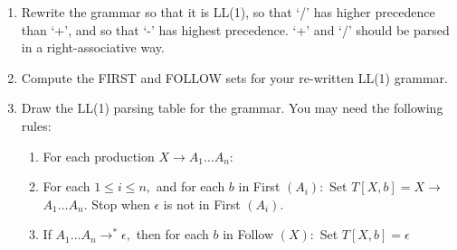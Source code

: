 \documentclass[a4paper]{exam}
\begin{document}
\begin{enumerate}
  \item Rewrite the grammar so that it is LL(1), so that ‘/’ has higher precedence than
  ‘+’, and so that ‘-’ has highest precedence. ‘+’ and ‘/’ should be parsed in a
  right-associative way.
  \item  Compute the FIRST and FOLLOW sets for your re-written LL(1) grammar.
  \item Draw the LL(1) parsing table for the grammar. You may need the following rules:
  \begin{enumerate}
    \item  For each production $X \rightarrow A_{1} \ldots A_{n}:$
    \item For each $1 \leq i \leq n,$ and for each $b$ in First $\left(A_{i}\right):$ Set $T[X, b]=X \rightarrow$
    $A_{1} \ldots A_{n} .$ Stop when $\epsilon$ is not in First $\left(A_{i}\right) .$
    \item If $A_{1} \ldots A_{n} \rightarrow^{*} \epsilon,$ then for each $b$ in Follow $(X):$ Set $T[X, b]=\epsilon$
  \end{enumerate}
\end{enumerate}
\end{document}
